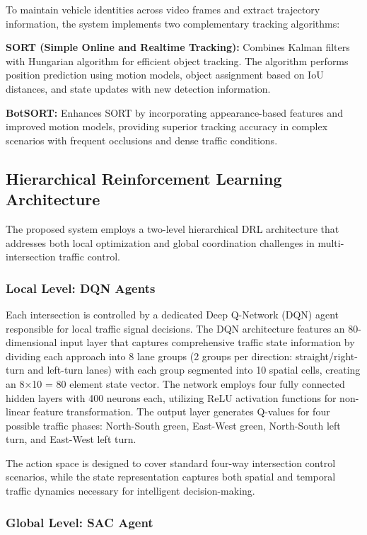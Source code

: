 To maintain vehicle identities across video frames and extract trajectory information, the system implements two complementary tracking algorithms:

\textbf{SORT (Simple Online and Realtime Tracking):} Combines Kalman filters with Hungarian algorithm for efficient object tracking. The algorithm performs position prediction using motion models, object assignment based on IoU distances, and state updates with new detection information.

\textbf{BotSORT:} Enhances SORT by incorporating appearance-based features and improved motion models, providing superior tracking accuracy in complex scenarios with frequent occlusions and dense traffic conditions.

\subsection{Hierarchical Reinforcement Learning Architecture}\label{subsec2a-3}

The proposed system employs a two-level hierarchical DRL architecture that addresses both local optimization and global coordination challenges in multi-intersection traffic control.

\subsubsection{Local Level: DQN Agents}

Each intersection is controlled by a dedicated Deep Q-Network (DQN) agent responsible for local traffic signal decisions. The DQN architecture features an 80-dimensional input layer that captures comprehensive traffic state information by dividing each approach into 8 lane groups (2 groups per direction: straight/right-turn and left-turn lanes) with each group segmented into 10 spatial cells, creating an 8×10 = 80 element state vector. The network employs four fully connected hidden layers with 400 neurons each, utilizing ReLU activation functions for non-linear feature transformation. The output layer generates Q-values for four possible traffic phases: North-South green, East-West green, North-South left turn, and East-West left turn.

The action space is designed to cover standard four-way intersection control scenarios, while the state representation captures both spatial and temporal traffic dynamics necessary for intelligent decision-making.

\subsubsection{Global Level: SAC Agent}

